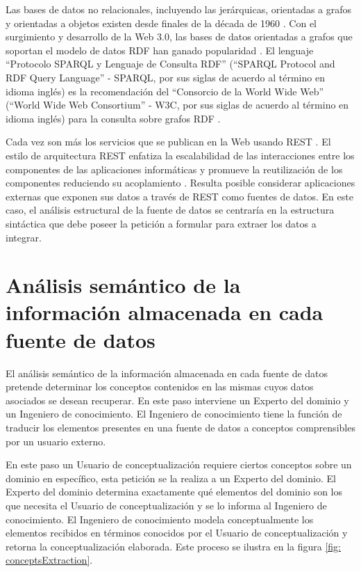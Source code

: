 Las bases de datos no relacionales, incluyendo las jerárquicas, orientadas a grafos y orientadas a objetos existen desde finales de la década de 1960 \citep{Leavitt2010}. Con el surgimiento y desarrollo de la Web 3.0, las bases de datos orientadas a grafos que soportan el modelo de datos RDF han ganado popularidad \citep{Zaki2017,BRISABOA2017106}. El lenguaje ``Protocolo SPARQL y Lenguaje de Consulta RDF'' (``SPARQL Protocol and RDF Query Language'' - SPARQL, por sus siglas de acuerdo al término en idioma inglés) es la recomendación del ``Consorcio de la World Wide Web'' (``World Wide Web Consortium'' - W3C, por sus siglas de acuerdo al término en idioma inglés) para la consulta sobre grafos RDF \citep{W3CSPARQLWorkingGroup2013}.

Cada vez son más los servicios que se publican en la Web usando REST \citep{Pautasso2014}. El estilo de arquitectura REST enfatiza la escalabilidad de las interacciones entre los componentes de las aplicaciones informáticas y promueve la reutilización de los componentes reduciendo su acoplamiento \citep{Pautasso2014}. Resulta posible considerar aplicaciones externas que exponen sus datos a través de REST como fuentes de datos. En este caso, el análisis estructural de la fuente de datos se centraría en la estructura sintáctica que debe poseer la petición a formular para extraer los datos a integrar.

\section{Análisis semántico de la información almacenada en cada fuente de datos}

El análisis semántico de la información almacenada en cada fuente de datos pretende determinar los conceptos contenidos en las mismas cuyos datos asociados se desean recuperar. En este paso interviene un Experto del dominio y un Ingeniero de conocimiento. El Ingeniero de conocimiento tiene la función de traducir los elementos presentes en una fuente de datos a conceptos comprensibles por un usuario externo.

En este paso un Usuario de conceptualización requiere ciertos conceptos sobre un dominio en específico, esta petición se la realiza a un Experto del dominio. El Experto del dominio determina exactamente qué elementos del dominio son los que necesita el Usuario de conceptualización y se lo informa al Ingeniero de conocimiento. El Ingeniero de conocimiento modela conceptualmente los elementos recibidos en términos conocidos por el Usuario de conceptualización y retorna la conceptualización elaborada. Este proceso se ilustra en la figura \ref{fig: conceptsExtraction}.

